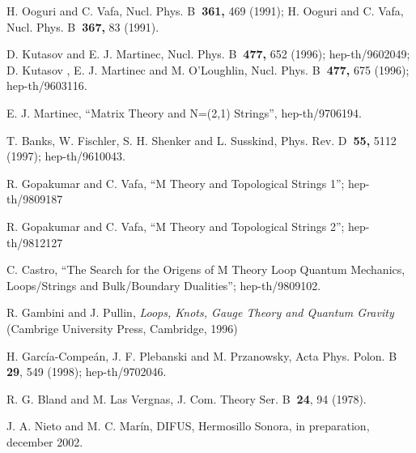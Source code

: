 \documentclass[a4paper,12pt]{article}
\begin{document}
\begin{thebibliography}{99}
  H. Ooguri and C. Vafa, Nucl. Phys. B\textbf{\ 361,} 469
(1991); H. Ooguri and C. Vafa, Nucl. Phys. B\textbf{\ 367,} 83 (1991).

  D. Kutasov and E. J. Martinec, Nucl. Phys. B\textbf{\ 477,}
652 (1996); hep-th/9602049; D. Kutasov , E. J. Martinec and M. O'Loughlin,
Nucl. Phys. B\textbf{\ 477,} 675 (1996); hep-th/9603116.

  E. J. Martinec, ``Matrix Theory and N=(2,1) Strings'',
hep-th/9706194.

  T. Banks, W. Fischler, S. H. Shenker and L. Susskind, Phys.
Rev. D\textbf{\ 55,} 5112 (1997); hep-th/9610043.

  R. Gopakumar and C. Vafa, ``M Theory and Topological Strings
1''; hep-th/9809187

  R. Gopakumar and C. Vafa, ``M Theory and Topological Strings
2''; hep-th/9812127

  C. Castro, ``The Search for the Origens of M Theory Loop
Quantum Mechanics, Loops/Strings and Bulk/Boundary Dualities'';
hep-th/9809102.

  R. Gambini and J. Pullin, \textit{Loops, Knots, Gauge Theory
and Quantum Gravity} (Cambrige University Press, Cambridge, 1996)

  H. Garc\'{i}a-Compe\'{a}n, J. F. Plebanski and M. Przanowsky,
Acta Phys. Polon. B \textbf{29}, 549 (1998); hep-th/9702046.

  R. G. Bland and M. Las Vergnas, J. Com. Theory Ser. B\textbf{\
24}, 94 (1978).

  J. A. Nieto and M. C. Mar\'{i}n, DIFUS, Hermosillo Sonora, in
preparation, december 2002.
\end{thebibliography}
\end{document}
